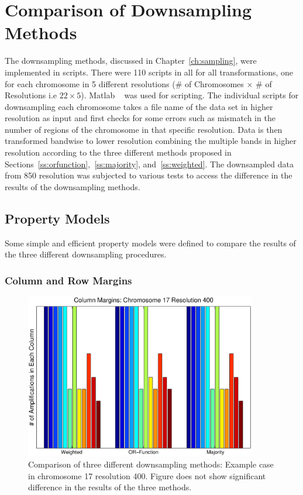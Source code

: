 \section{Comparison of Downsampling Methods}
\label{s:comparisionMethods}
The downsampling methods, discussed in Chapter~\ref{ch:sampling}, were implemented in scripts. There were 110 scripts in all for all transformations, one for each chromosome in 5 different resolutions (\# of Chromosomes $\times$ \# of Resolutions i.e $22 \times 5$). Matlab \textregistered~\cite{matlab} was used for scripting. The individual scripts for downsampling each chromosome takes a file name of the data set in higher resolution as input and first checks for some errors such as mismatch in the number of regions of the chromosome in that specific resolution. Data is then transformed bandwise to lower resolution combining the multiple bands in higher resolution according to the three different methods proposed in Sections~\ref{ss:orfunction},~\ref{ss:majority}, and~\ref{ss:weighted}. The downsampled data from 850 resolution was subjected to various tests to access the difference in the results of the downsampling methods. 

\subsection{Property Models}
\label{ss:totamplification}
Some simple and efficient property models were defined to compare the results of the three different downsampling procedures. 

\subsubsection{Column and Row Margins}
\label{sss:rowcolmargins}

\begin{figure}[h!]
\centering
\includegraphics[width=0.9\textwidth]{figures/columnsumChr17}
\caption[Aberrations in each column]{Comparison of three different downsampling methods: Example case in chromosome 17 resolution 400. Figure does not show significant difference in the results of the three methods.}\label{Fig:histchr6dm393}
\end{figure}

